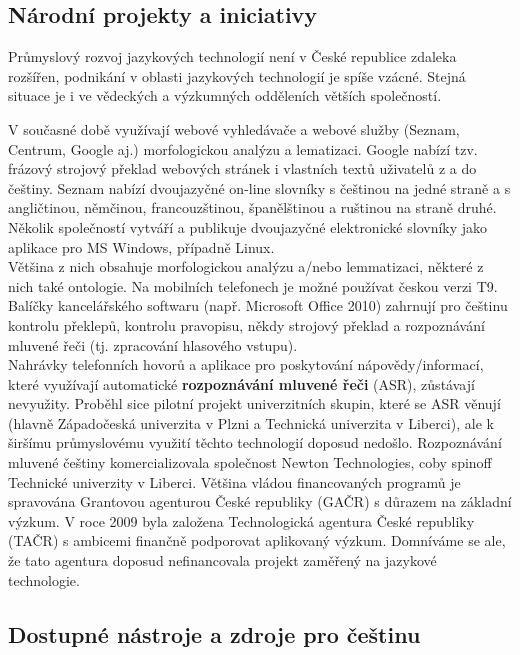 \begin{multicols}{2}
\subsection{Národní projekty a iniciativy}
Průmyslový rozvoj jazykových technologií není v České republice zdaleka rozšířen, podnikání v oblasti jazykových technologií je spíše vzácné. Stejná situace je i ve vědeckých a výzkumných odděleních větších společností.

V současné době využívají webové vyhledávače a webové služby (Seznam, Centrum, Google aj.) morfologickou analýzu a lematizaci. Google nabízí tzv. frázový strojový překlad webových stránek i vlastních textů uživatelů z a do češtiny. Seznam nabízí dvoujazyčné on-line slovníky s češtinou na jedné straně a s angličtinou, němčinou, francouzštinou, španělštinou a ruštinou na straně druhé. Několik společností vytváří a publikuje dvoujazyčné elektronické slovníky jako aplikace pro MS Windows, případně Linux.\\
Většina z nich obsahuje morfologickou analýzu a/nebo lemmatizaci, některé z nich také ontologie. Na mobilních telefonech je možné používat českou verzi T9. Balíčky kancelářského softwaru (např. Microsoft Office 2010) zahrnují pro češtinu kontrolu překlepů, kontrolu pravopisu, někdy strojový překlad a rozpoznávání mluvené řeči (tj. zpracování hlasového vstupu).\\
Nahrávky telefonních hovorů a aplikace pro poskytování nápovědy/informací, které využívají automatické \textbf{rozpoznávání mluvené řeči} (ASR), zůstávají nevyužity. Proběhl sice pilotní projekt univerzitních skupin, které se ASR věnují (hlavně Západočeská univerzita v Plzni a Technická univerzita v Liberci), ale k širšímu průmyslovému využití těchto technologií doposud nedošlo.
Rozpoznávání mluvené češtiny komercializovala společnost Newton Technologies, coby spinoff Technické univerzity v Liberci. Většina vládou financovaných programů je spravována Grantovou agenturou České republiky (GAČR) s důrazem na základní výzkum. V roce 2009 byla založena Technologická agentura České republiky (TAČR) s ambicemi finančně podporovat aplikovaný výzkum. Domníváme se ale, že tato agentura doposud nefinancovala projekt zaměřený na jazykové technologie.

\subsection{Dostupné nástroje a zdroje pro češtinu}
  

\end{multicols}
